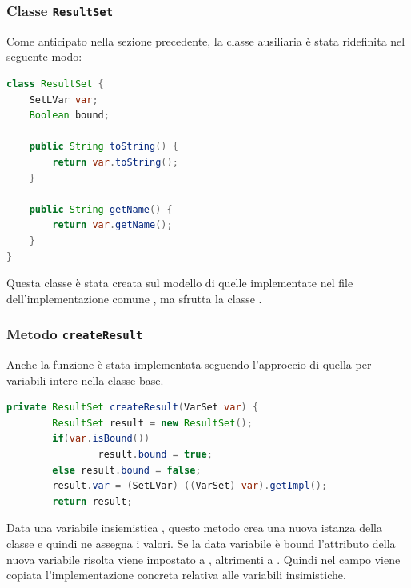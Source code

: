 \subsubsection{Classe \texttt{ResultSet}}
Come anticipato nella sezione precedente, la classe ausiliaria 
è stata ridefinita nel seguente modo:
\begin{lstlisting}[language = Java,
                   caption = {\files{ResultSet}.}]
class ResultSet {
	SetLVar var;
	Boolean bound;
	
	public String toString() {
		return var.toString();
	}
	
	public String getName() {
		return var.getName();
	}
}
\end{lstlisting}
Questa classe è stata creata sul modello di quelle implementate nel file 
dell'implementazione comune
, ma sfrutta la classe .

\subsubsection{Metodo \texttt{createResult}}
Anche la funzione  è stata implementata seguendo l'approccio
di quella per variabili intere nella classe base.
\begin{lstlisting}[language = Java,
                 caption = {\files{createResult} per variabili insiemistiche.}]
private ResultSet createResult(VarSet var) {
        ResultSet result = new ResultSet();
        if(var.isBound())
                result.bound = true;
        else result.bound = false;
        result.var = (SetLVar) ((VarSet) var).getImpl();
        return result;
\end{lstlisting}
Data una variabile insiemistica , questo metodo crea una nuova
istanza della classe  e quindi ne assegna i valori.
Se la data variabile è bound l'attributo  della
nuova variabile risolta viene impostato a , altrimenti a
. Quindi nel campo  viene copiata 
l'implementazione concreta relativa alle variabili insimistiche.

